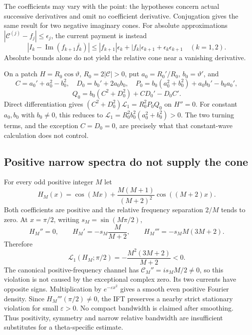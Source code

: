 \documentclass[11pt]{article}
\theoremstyle{definition}
\theoremstyle{remark}
\newcommand{\Ima}{\operatorname{Im}}
\begin{document}
The coefficients may vary with the point: the hypotheses concern actual
successive derivatives and omit no coefficient derivative. Conjugation
gives the same result for two negative imaginary cones. For absolute
approximations $|\mathcal C^{(j)}-f_j|\le\epsilon_j$, the current
payment is instead
\[
 |I_k-\Ima(f_{k+1}\overline{f_k})|
 \le |f_{k+1}|\epsilon_k+|f_k|\epsilon_{k+1}
       +\epsilon_k\epsilon_{k+1}\quad(k=1,2).
\]
Absolute bounds alone do not yield the relative cone near a vanishing
derivative.

On a patch $H=R_0\cos\vartheta$, $R_0=2|\mathcal C|>0$, put
$a_0=R_0'/R_0$, $b_0=\vartheta'$, and
\[
 C=a_0'+a_0^2-b_0^2,\quad D_0=b_0'+2a_0b_0,\quad
 P_0=b_0(a_0^2+b_0^2)+a_0b_0'-b_0a_0',
\]
\[
 Q_0=b_0(C^2+D_0^2)+CD_0'-D_0C'.
\]
Direct differentiation gives
$(C^2+D_0^2)\mathscr L_1=R_0^2P_0Q_0$ on $H''=0$.
For constant $a_0,b_0$ with $b_0\ne0$, this reduces to
$\mathscr L_1=R_0^2b_0^2(a_0^2+b_0^2)>0$.
The two turning terms, and the exception $C=D_0=0$, are precisely
what that constant-wave calculation does not control.

\subsection{Positive narrow spectra do not supply the cone}

For every odd positive integer $M$ let
\[
 H_M(x)=\cos(Mx)+\frac{M(M+1)}{(M+2)^2}\cos((M+2)x).
\]
Both coefficients are positive and the relative frequency separation
$2/M$ tends to zero. At $x=\pi/2$, writing $s_M=\sin(M\pi/2)$,
\[
 H_M''=0,\qquad H_M'=-s_M\frac{M}{M+2},\qquad
 H_M'''=-s_MM(3M+2).
\]
Therefore
\begin{equation}
 \mathscr L_1(H_M;\pi/2)=-\frac{M^2(3M+2)}{M+2}<0.
 \label{eq:narrow-band-obstruction}
\end{equation}
The canonical positive-frequency channel has
$\mathcal C_M''=is_MM/2\ne0$, so this violation is not caused
by the exceptional complex zero. Its two currents have opposite signs.
Multiplication by $e^{-\varepsilon x^2}$ gives a smooth even positive
Fourier density. Since $H_M'''(\pi/2)\ne0$, the IFT preserves a nearby
strict stationary violation for small $\varepsilon>0$. No compact
bandwidth is claimed after smoothing. Thus positivity, symmetry and
narrow relative bandwidth are insufficient substitutes for a
theta-specific estimate.
\end{document}
